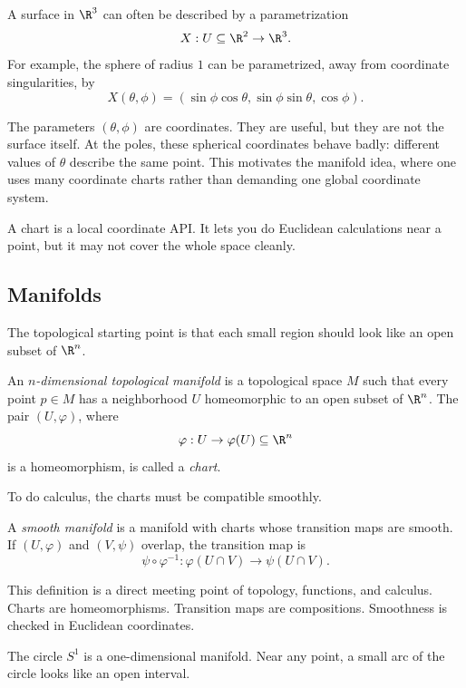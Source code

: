 A surface in $\R^3$ can often be described by a parametrization
\[
X:U\subseteq\R^2\to\R^3.
\]
For example, the sphere of radius $1$ can be parametrized, away from coordinate
singularities, by
\[
X(\theta,\phi)=(\sin\phi\cos\theta,\sin\phi\sin\theta,\cos\phi).
\]

The parameters $(\theta,\phi)$ are coordinates. They are useful, but they are
not the surface itself. At the poles, these spherical coordinates behave badly:
different values of $\theta$ describe the same point. This motivates the
manifold idea, where one uses many coordinate charts rather than demanding one
global coordinate system.

\begin{intuitionbox}
A chart is a local coordinate API. It lets you do Euclidean calculations near a
point, but it may not cover the whole space cleanly.
\end{intuitionbox}

\subsection{Manifolds}

The topological starting point is that each small region should look like an
open subset of $\R^n$.

\begin{definition}
An \emph{$n$-dimensional topological manifold} is a topological space $M$ such
that every point $p\in M$ has a neighborhood $U$ homeomorphic to an open subset
of $\R^n$. The pair $(U,\varphi)$, where
\[
\varphi:U\to \varphi(U)\subseteq\R^n
\]
is a homeomorphism, is called a \emph{chart}.
\end{definition}

To do calculus, the charts must be compatible smoothly.

\begin{definition}
A \emph{smooth manifold} is a manifold with charts whose transition maps are
smooth. If $(U,\varphi)$ and $(V,\psi)$ overlap, the transition map is
\[
\psi\circ\varphi^{-1}:\varphi(U\cap V)\to\psi(U\cap V).
\]
\end{definition}

This definition is a direct meeting point of topology, functions, and calculus.
Charts are homeomorphisms. Transition maps are compositions. Smoothness is
checked in Euclidean coordinates.

\begin{example}
The circle $S^1$ is a one-dimensional manifold. Near any point, a small arc of
the circle looks like an open interval.
\end{example}

